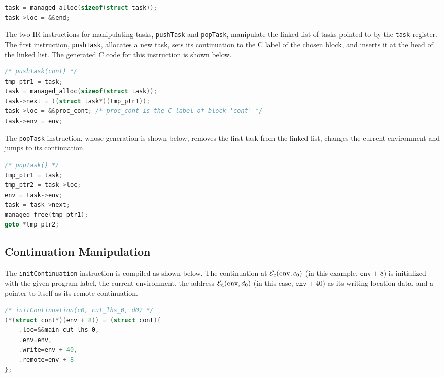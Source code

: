 \begin{lstlisting}[language=C, frame=bottom]
task = managed_alloc(sizeof(struct task));
task->loc = &&end;
\end{lstlisting}

The two \ac{IR} instructions for manipulating tasks, \texttt{pushTask} and \texttt{popTask}, manipulate the linked list of tasks pointed to by the \texttt{task} register. The first instruction, \texttt{pushTask}, allocates a new task, sets its continuation to the C label of the chosen block, and inserts it at the head of the linked list. The generated C code for this instruction is shown below.

\begin{lstlisting}[language=C, frame=bottom]
/* pushTask(cont) */
tmp_ptr1 = task;
task = managed_alloc(sizeof(struct task));
task->next = ((struct task*)(tmp_ptr1));
task->loc = &&proc_cont; /* proc_cont is the C label of block 'cont' */
task->env = env;
\end{lstlisting}

The \texttt{popTask} instruction, whose generation is shown below, removes the first task from the linked list, changes the current environment and jumps to its continuation.

\begin{lstlisting}[language=C, frame=bottom]
/* popTask() */
tmp_ptr1 = task;
tmp_ptr2 = task->loc;
env = task->env;
task = task->next;
managed_free(tmp_ptr1);
goto *tmp_ptr2;
\end{lstlisting}

\subsection{Continuation Manipulation}

The \texttt{initContinuation} instruction is compiled as shown below. The continuation at $\mathcal{E}_\text{c}(\texttt{env}, c_0)$ (in this example, $\texttt{env} + 8$) is initialized with the given program label, the current environment, the address $\mathcal{E}_\text{d}(\texttt{env}, d_0)$ (in this case, $\texttt{env} + 40$) as its writing location data, and a pointer to itself as its remote continuation.

\begin{lstlisting}[language=C, frame=bottom]
/* initContinuation(c0, cut_lhs_0, d0) */
(*(struct cont*)(env + 8)) = (struct cont){
    .loc=&&main_cut_lhs_0,
    .env=env,
    .write=env + 40,
    .remote=env + 8
};
\end{lstlisting}

